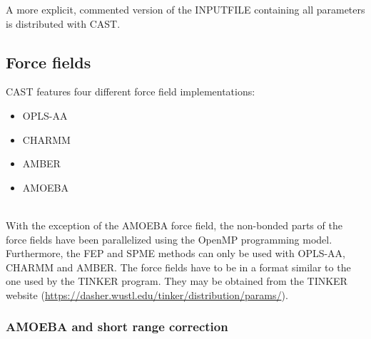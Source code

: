 \documentclass[10pt,a4paper]{article} %
\newif\ifdevmode %
\begin{document}
	A more explicit, commented version of the INPUTFILE containing all parameters is distributed with \ac{CAST}.
		
	\subsection{Force fields}
	\ac{CAST} features four different force field implementations:\\
	\begin{itemize}
	 \item \acf{OPLS-AA}\supercite{oplsaa, oplsaa2} \item \acf{CHARMM}\supercite{charmm}
	 \item \acf{AMBER}\supercite{amber}
	 \item \acf{AMOEBA}\supercite{amoeba_current, amoeba_current2}
	\end{itemize}~\\
	With the exception of the \ac{AMOEBA} force field, the non-bonded parts of the force fields have been parallelized using the OpenMP programming model. Furthermore, the \ac{FEP} and \ac{SPME} methods can only be used with \ac{OPLS-AA}, \ac{CHARMM} and \ac{AMBER}. The force fields have to be in a format similar to the one used by the TINKER\supercite{tinker} program. They may be obtained from the TINKER\supercite{tinker} website (\url{https://dasher.wustl.edu/tinker/distribution/params/}).
		\subsubsection{AMOEBA and short range correction}
		\ifdevmode \colorbox{red}{Blalala yaddayaddayadda... insert stuff here.} \fi


\end{document}

